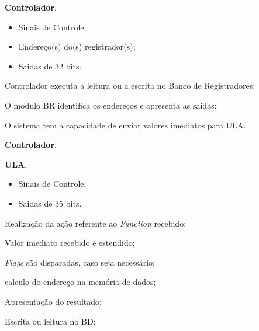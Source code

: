 \documentclass{article}
\begin{document}
  \actors
    \begin{description}
     \item \textbf{Controlador}.
    \end{description}
    
  \preconditions 
    \begin{itemize}
    \item Sinais de Controle;
    \item Endereço(s) do(s) registrador(s);
    \end{itemize}

  \postconditions
    \begin{itemize}
    \item Saidas de 32 bits.
    \end{itemize}

  
  \begin{mainflow}
    \item Controlador executa a leitura ou a escrita no Banco de Registradores;
    \item O modulo BR identifica os endereços e apresenta as saidas;
  \end{mainflow}  

   O sistema tem a capacidade de enviar valores imediatos para ULA.
  
  \actors
    \begin{description}
     \item \textbf{Controlador}.
     \item \textbf{ULA}.
    \end{description}
    
  \preconditions 
    \begin{itemize}
    \item Sinais de Controle;
    \end{itemize}

  \postconditions
    \begin{itemize}
    \item Saidas de 35 bits.
    \end{itemize}

  
  \begin{mainflow}    \item Realização da ação referente ao \textit{Function} recebido;
    \item Valor imediato recebido é estendido;
    \item \textit{Flags} são disparadas, caso seja necessário;
    \item calculo do endereço na memória de dados; 
    \item Apresentação do resultado;
    \item Escrita ou leitura no BD;
  \end{mainflow}
  
  
 

% 
% 
\end{document}

